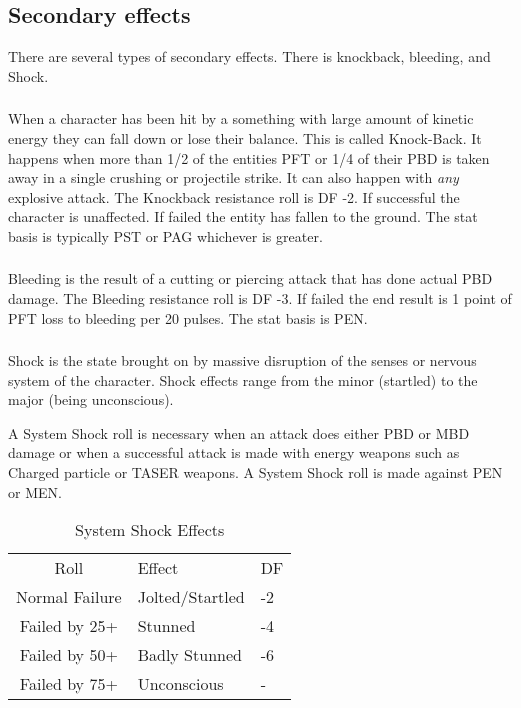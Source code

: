 \subsection{Secondary effects}

There are several types of secondary effects. There is knockback,
bleeding, and Shock.

\subsubsection{}

When a character has been hit by a something with large amount of kinetic
energy they can fall down or lose their balance. This is called Knock-Back.
It happens when more than 1/2 of the entities PFT or 1/4 of their PBD is taken
away in a single crushing or projectile strike. It can also happen with {\em any}
explosive attack. The Knockback resistance roll is DF -2. If successful the
character is unaffected. If failed the entity has fallen to the ground.
The stat basis is typically PST or PAG whichever is greater.

\subsubsection{}
Bleeding is the result of a cutting or piercing attack that has done
actual PBD damage. The Bleeding resistance roll is DF -3. If failed the
end result is 1 point of PFT loss to bleeding per 20 pulses. The stat
basis is PEN.

\subsubsection{}

Shock is the state brought on by massive disruption of the senses or
nervous system of the character. Shock effects range from the minor
(startled) to the major (being unconscious).

A System Shock roll is necessary when an attack does
either PBD or MBD damage or when a successful attack is made with
energy weapons such as Charged particle or TASER weapons.
A System Shock roll is made against PEN or MEN.


\begin{table}
	\begin{tabular}{cll}
	Roll			  & Effect & DF \\
	Normal Failure	  & Jolted/Startled & -2  \\
	Failed by 25+	   & Stunned & -4  \\
	Failed by 50+	   & Badly Stunned & -6 \\
    Failed by 75+     & Unconscious & - \\
	\end{tabular}
    \caption{System Shock Effects}
\end{table}

